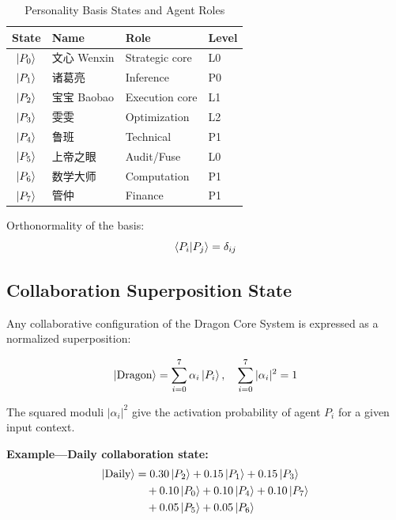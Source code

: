 \documentclass[conference]{IEEEtran}
\begin{document}
\begin{table}[!ht]
\caption{Personality Basis States and Agent Roles}
\label{tab:personalities}
\centering
\begin{tabular}{clll}
\toprule
\textbf{State} & \textbf{Name} & \textbf{Role} & \textbf{Level} \\
\midrule
$\ket{P_0}$ & 文心 Wenxin   & Strategic core    & L0 \\
$\ket{P_1}$ & 诸葛亮        & Inference         & P0 \\
$\ket{P_2}$ & 宝宝 Baobao   & Execution core    & L1 \\
$\ket{P_3}$ & 雯雯          & Optimization      & L2 \\
$\ket{P_4}$ & 鲁班          & Technical         & P1 \\
$\ket{P_5}$ & 上帝之眼      & Audit/Fuse        & L0 \\
$\ket{P_6}$ & 数学大师      & Computation       & P1 \\
$\ket{P_7}$ & 管仲          & Finance           & P1 \\
\bottomrule
\end{tabular}
\end{table}

Orthonormality of the basis:
\begin{equation}
  \braket{P_i}{P_j} = \delta_{ij}
  \label{eq:ortho}
\end{equation}

\subsection{Collaboration Superposition State}

Any collaborative configuration of the Dragon Core
System is expressed as a normalized superposition:

\begin{equation}
  \ket{\text{Dragon}} = \sum_{i=0}^{7} \alpha_i \ket{P_i},
  \quad \sum_{i=0}^{7} |\alpha_i|^2 = 1
  \label{eq:superposition}
\end{equation}

The squared moduli $|\alpha_i|^2$ give the activation
probability of agent $P_i$ for a given input context.

\textbf{Example---Daily collaboration state:}
\begin{align}
  \ket{\text{Daily}} &= 0.30\ket{P_2} + 0.15\ket{P_1}
    + 0.15\ket{P_3} \nonumber \\
  &\quad + 0.10\ket{P_0} + 0.10\ket{P_4}
    + 0.10\ket{P_7} \nonumber \\
  &\quad + 0.05\ket{P_5} + 0.05\ket{P_6}
  \label{eq:daily}
\end{align}
\end{document}
